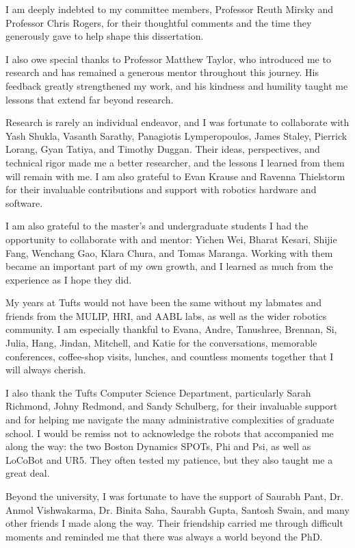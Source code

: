 I am deeply indebted to my committee members, Professor Reuth Mirsky and Professor Chris Rogers, for their thoughtful comments and the time they generously gave to help shape this dissertation.

I also owe special thanks to Professor Matthew Taylor, who introduced me to research and has remained a generous mentor throughout this journey. His feedback greatly strengthened my work, and his kindness and humility taught me lessons that extend far beyond research.

Research is rarely an individual endeavor, and I was fortunate to collaborate with Yash Shukla, Vasanth Sarathy, Panagiotis Lymperopoulos, James Staley, Pierrick Lorang, Gyan Tatiya, and Timothy Duggan. Their ideas, perspectives, and technical rigor made me a better researcher, and the lessons I learned from them will remain with me. I am also grateful to Evan Krause and Ravenna Thielstorm for their invaluable contributions and support with robotics hardware and software.

I am also grateful to the master’s and undergraduate students I had the opportunity to collaborate with and mentor: Yichen Wei, Bharat Kesari, Shijie Fang, Wenchang Gao, Klara Chura, and Tomas Maranga. Working with them became an important part of my own growth, and I learned as much from the experience as I hope they did.

My years at Tufts would not have been the same without my labmates and friends from the MULIP, HRI, and AABL labs, as well as the wider robotics community. I am especially thankful to Evana, Andre, Tanushree, Brennan, Si, Julia, Hang, Jindan, Mitchell, and Katie for the conversations, memorable conferences, coffee-shop visits, lunches, and countless moments together that I will always cherish.

I also thank the Tufts Computer Science Department, particularly Sarah Richmond, Johny Redmond, and Sandy Schulberg, for their invaluable support and for helping me navigate the many administrative complexities of graduate school. I would be remiss not to acknowledge the robots that accompanied me along the way: the two Boston Dynamics SPOTs, Phi and Psi, as well as LoCoBot and UR5. They often tested my patience, but they also taught me a great deal.

Beyond the university, I was fortunate to have the support of Saurabh Pant, Dr. Anmol Vishwakarma, Dr. Binita Saha, Saurabh Gupta, Santosh Swain, and many other friends I made along the way. Their friendship carried me through difficult moments and reminded me that there was always a world beyond the PhD.

